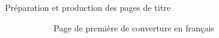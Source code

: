 \begin{dbexample}{Préparation et production des pages de titre}{}
\begin{landscape}
  \begin{figure}[htb]
    \centering
    \begin{subfigure}[b]{.45\linewidth}
      \centering%
      \caption{Page de première de couverture en français}
      \label{fig-maketitle-fr}
    \end{subfigure}%
    \begin{subfigure}[b]{.45\linewidth}
      \centering%

\end{subfigure}
\end{figure}
\end{landscape}
\end{dbexample}
